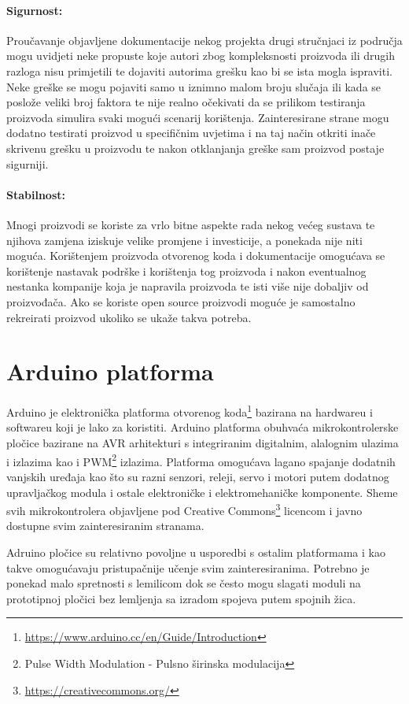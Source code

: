 \paragraph{Sigurnost:}
Proučavanje objavljene dokumentacije nekog projekta drugi stručnjaci iz područja mogu uvidjeti neke propuste koje autori zbog kompleksnosti proizvoda ili drugih razloga nisu primjetili te dojaviti autorima grešku kao bi se ista mogla ispraviti. 
Neke greške se mogu pojaviti samo u iznimno malom broju slučaja ili kada se poslože veliki broj faktora te nije realno očekivati da se prilikom testiranja proizvoda simulira svaki mogući scenarij korištenja.
Zainteresirane strane mogu dodatno testirati proizvod u specifičnim uvjetima i na taj način otkriti inače skrivenu grešku u proizvodu te nakon otklanjanja greške sam proizvod postaje sigurniji.

\paragraph{Stabilnost:}
Mnogi proizvodi se koriste za vrlo bitne aspekte rada nekog većeg sustava te njihova zamjena iziskuje velike promjene i investicije, a ponekada nije niti moguća.
Korištenjem proizvoda otvorenog koda i dokumentacije omogućava se korištenje nastavak podrške i korištenja tog proizvoda i nakon eventualnog nestanka kompanije koja je napravila proizvoda te isti više nije dobaljiv od proizvođača. 
Ako se koriste open source proizvodi moguće je samostalno rekreirati proizvod ukoliko se ukaže takva potreba.


\section{Arduino platforma}
Arduino je elektronička platforma otvorenog koda\footnote{\url{https://www.arduino.cc/en/Guide/Introduction}} bazirana na hardwareu i softwareu koji je lako za koristiti.
Arduino platforma obuhvaća mikrokontrolerske pločice bazirane na AVR arhitekturi s integriranim digitalnim, alalognim ulazima i izlazima kao i PWM\footnote{Pulse Width Modulation - Pulsno širinska modulacija} izlazima.
Platforma omogućava lagano spajanje dodatnih vanjskih uređaja kao što su razni senzori, releji, servo i motori putem dodatnog upravljačkog modula i ostale elektroničke i elektromehaničke komponente.
Sheme svih mikrokontrolera objavljene pod Creative Commons\footnote{\url{https://creativecommons.org/}} licencom i javno dostupne svim zainteresiranim stranama.

Adruino pločice su relativno povoljne u usporedbi s ostalim platformama i kao takve omogućavaju pristupačnije učenje svim zainteresiranima.
Potrebno je ponekad malo spretnosti s lemilicom dok se često mogu slagati moduli na prototipnoj pločici bez lemljenja sa izradom spojeva putem spojnih žica.

